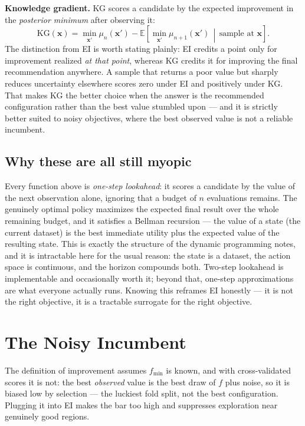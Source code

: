 \documentclass[conference]{IEEEtran}
\begin{document}
\textbf{Knowledge gradient.} KG scores a candidate by the expected improvement in the \textit{posterior minimum} after observing it:
\begin{equation}
    \mathrm{KG}(\mathbf{x}) = \min_{\mathbf{x}'} \mu_n(\mathbf{x}')
      - \mathbb{E}\!\left[\min_{\mathbf{x}'} \mu_{n+1}(\mathbf{x}') \,\middle|\, \text{sample at } \mathbf{x}\right].
\end{equation}
The distinction from EI is worth stating plainly: EI credits a point only for improvement realized \textit{at that point}, whereas KG credits it for improving the final recommendation anywhere. A sample that returns a poor value but sharply reduces uncertainty elsewhere scores zero under EI and positively under KG. That makes KG the better choice when the answer is the recommended configuration rather than the best value stumbled upon --- and it is strictly better suited to noisy objectives, where the best observed value is not a reliable incumbent.

\subsection*{Why these are all still myopic}
Every function above is \textit{one-step lookahead}: it scores a candidate by the value of the next observation alone, ignoring that a budget of $n$ evaluations remains. The genuinely optimal policy maximizes the expected final result over the whole remaining budget, and it satisfies a Bellman recursion --- the value of a state (the current dataset) is the best immediate utility plus the expected value of the resulting state. This is exactly the structure of the dynamic programming notes, and it is intractable here for the usual reason: the state is a dataset, the action space is continuous, and the horizon compounds both. Two-step lookahead is implementable and occasionally worth it; beyond that, one-step approximations are what everyone actually runs. Knowing this reframes EI honestly --- it is not the right objective, it is a tractable surrogate for the right objective.

\section*{The Noisy Incumbent}
The definition of improvement assumes $f_{\min}$ is known, and with cross-validated scores it is not: the best \textit{observed} value is the best draw of $f$ plus noise, so it is biased low by selection --- the luckiest fold split, not the best configuration. Plugging it into EI makes the bar too high and suppresses exploration near genuinely good regions.
\end{document}
